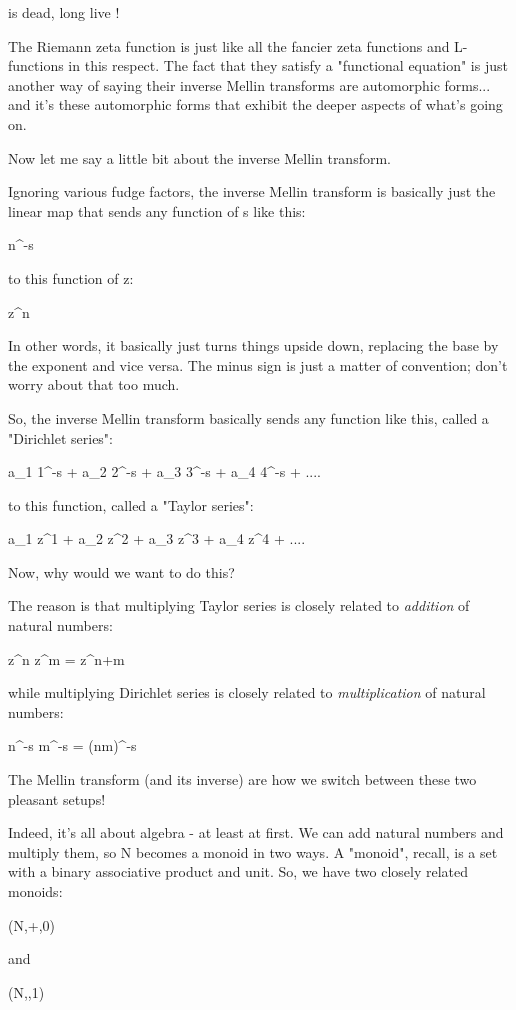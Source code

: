 \zeta  is dead, long live \theta !

The Riemann zeta function is just like all the fancier zeta functions and 
L-functions in this respect.  The fact that they satisfy a "functional 
equation" is just another way of saying their inverse
Mellin transforms are 
automorphic forms... and it's these automorphic forms that exhibit the 
deeper aspects of what's going on.

Now let me say a little bit about the inverse Mellin transform.

Ignoring various fudge factors, the inverse 
Mellin transform is basically just 
the linear map that sends any function of s like this:

n^{-s}

to this function of z:

z^{n}

In other words, it basically just turns things upside down, replacing the 
base by the exponent and vice versa.  The minus sign is just a matter of 
convention; don't worry about that too much.

So, the inverse
Mellin transform basically sends any function like this, called a 
"Dirichlet series":

a_{1} 1^{-s} + a_{2} 2^{-s} + a_{3} 3^{-s} + a_{4} 4^{-s} + ....

to this function, called a "Taylor series":

a_{1} z^{1} + a_{2} z^{2} + a_{3} z^{3} + a_{4} z^{4} + ....

Now, why would we want to do this? 

The reason is that multiplying Taylor series is closely related 
to \emph{addition} 
of natural numbers:

z^{n} z^{m} = z^{n+m}

while multiplying Dirichlet series is closely related to 
\emph{multiplication}
of natural numbers:

n^{-s} m^{-s} = (nm)^{-s}

The Mellin transform (and its inverse) are how we switch between these two 
pleasant setups!

Indeed, it's all about algebra - at least at first.  We can add natural 
numbers and multiply them, so N becomes a monoid in two ways.  A "monoid", 
recall, is a set with a binary associative product and unit.  So, we have 
two closely related monoids:

(N,+,0)

and 

(N,\times ,1)

